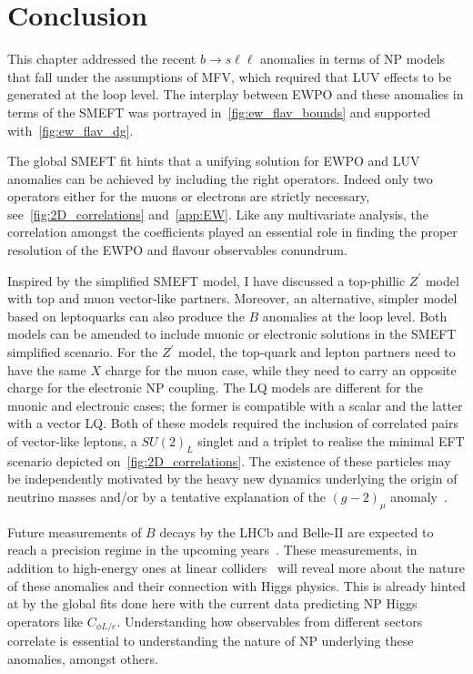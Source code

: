 \section{Conclusion}
\label{sec:sum}
\par This chapter addressed the recent $b \to s \ell \ell $ anomalies in terms of NP models that fall under the assumptions of MFV, which required that LUV effects to be generated at the loop level.  The interplay between EWPO and these anomalies in terms of the SMEFT was portrayed in~\autoref{fig:ew_flav_bounds} and supported with~\autoref{fig:ew_flav_dg}. 
\par The global SMEFT fit hints that a unifying solution for EWPO and LUV anomalies can be achieved by including the right operators. Indeed only two operators either for the muons or electrons are strictly necessary, see~\autoref{fig:2D_correlations} and~\autoref{app:EW}. Like any multivariate analysis, the correlation amongst the coefficients played an essential role in finding the proper resolution of the EWPO and flavour observables conundrum. 
\par Inspired by the simplified SMEFT model, I have discussed a top-phillic $Z^\prime$ model with top and muon vector-like partners. Moreover, an alternative, simpler model based on leptoquarks can also produce the $B$ anomalies at the loop level. Both models can be amended to include muonic or electronic solutions in the SMEFT simplified scenario. For the $Z^\prime$ model, the top-quark and lepton partners need to have the same $X$ charge for the muon case, while they need to carry an opposite charge for the electronic NP coupling.  The LQ models are different for the muonic and electronic cases; the former is compatible with a scalar and the latter with a vector LQ. 
Both of these models required the inclusion of correlated pairs of vector-like leptons, a $SU(2)_L$ singlet and a triplet to realise the minimal EFT scenario depicted on~\autoref{fig:2D_correlations}. The existence of these particles may be independently motivated by the heavy new dynamics underlying the origin of neutrino masses and/or by a tentative explanation of the $(g-2)_{\mu}$ anomaly~\cite{Kannike:2011ng,Muong-2:2021ojo}.

\par Future measurements of $B$ decays by the LHCb and Belle-II are expected to reach a precision regime in the upcoming years~\cite{Kou:2018nap,Bediaga:2018lhg}. These measurements, in addition to high-energy ones at linear colliders~\cite{deBlas:2019rxi,deBlas:2019wgy} will reveal more about the nature of these anomalies and their connection with Higgs physics. This is already hinted at by the global fits done here with the current data predicting NP Higgs operators like $ C_{\phi L/e}$. Understanding how observables from different sectors correlate is essential to understanding the nature of NP underlying these anomalies, amongst others.



